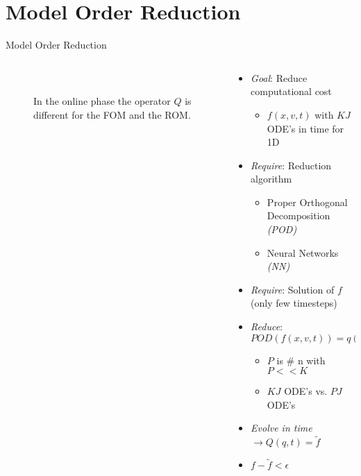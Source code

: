 \documentclass[usenames,dvipsnames,Nike]{tuberlinbeamer}
\begin{document}
\section{Model Order Reduction}
\begin{frame}[fragile]{Model Order Reduction}
	\begin{columns}
		\begin{column}{.5\textwidth}
			\begin{figure}
				\\
				\caption{In the online phase the operator $Q$ is different for the FOM and the ROM.}
			\end{figure}
		\end{column}
		\begin{column}{.5\textwidth}
			\begin{itemize}
				\item<1->\emph{Goal}: Reduce computational cost
				\begin{itemize}
					\item<2->$f(x,v,t)$ with $KJ$ ODE's in time for 1D
				\end{itemize}
				\item<3-> \emph{Require}: Reduction algorithm 
				\begin{itemize}
					\item<4-> Proper Orthogonal Decomposition \emph{(POD)}
					\item<4-> Neural Networks \emph{(NN)}
				\end{itemize}
				\item<5->\emph{Require}: Solution of $f$ (only few timesteps)
				\item<6->\emph{Reduce}: $POD(f(x,v,t))=q(x,n,t)$
				\begin{itemize}
					\item<7->$P$ is \# n with $P<<K$
					\item<8->$KJ$ ODE's vs. $PJ$ ODE's
				\end{itemize}
				\item<9->\emph{Evolve in time}  $\rightarrow Q(q,t)=\tilde{f}$
				\item<10->$f-\tilde{f}<\epsilon$
			\end{itemize}
		\end{column}
	\end{columns}
\end{frame}
\end{document}
